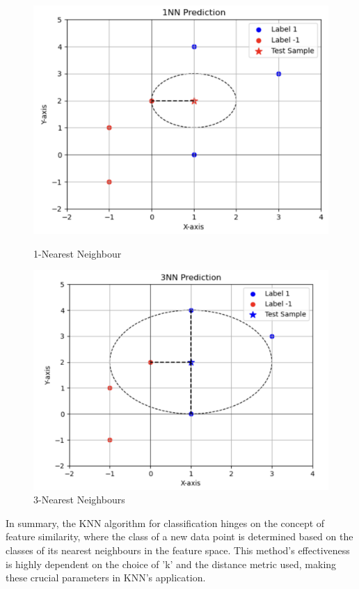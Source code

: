 \documentclass[letterpaper,10pt]{article}
\begin{document}
\begin{figure}[ht]
    \centering
    \begin{minipage}{0.45\textwidth}
        \centering
        \includegraphics[width=\textwidth]{1NN.png}
        \caption{1-Nearest Neighbour}
        \label{fig:1nn}
    \end{minipage}\hfill
    \begin{minipage}{0.45\textwidth}
        \centering
        \includegraphics[width=\textwidth]{3NN.png}
        \caption{3-Nearest Neighbours}
        \label{fig:3nn}
    \end{minipage}
\end{figure}

In summary, the KNN algorithm for classification hinges on the concept of feature similarity, where the class of a new data point is determined based on the classes of its nearest neighbours in the feature space. This method's effectiveness is highly dependent on the choice of 'k' and the distance metric used, making these crucial parameters in KNN's application.
\end{document}
